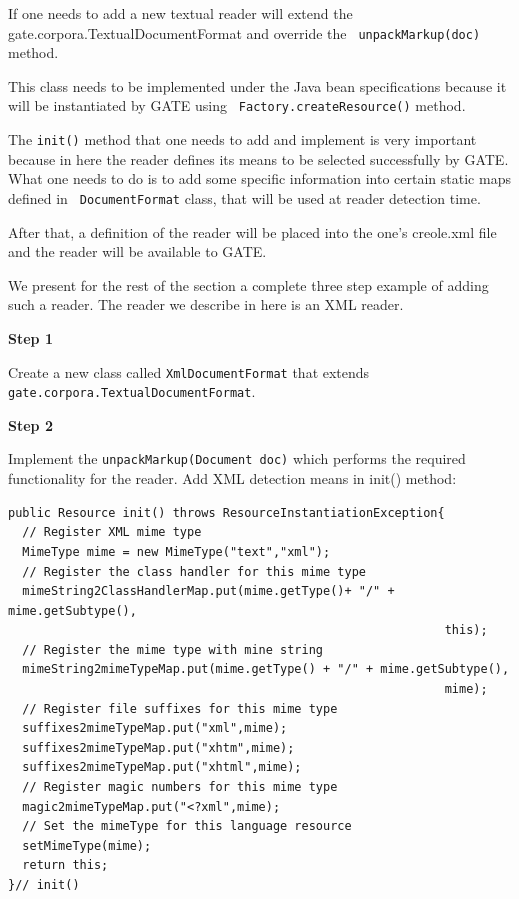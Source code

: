 If one needs to add a new textual reader will extend the
gate.corpora.TextualDocumentFormat and override the {\tt
unpackMarkup(doc)} method.

This class needs to be implemented under the Java bean
specifications because it will be instantiated by GATE using {\tt
Factory.createResource()} method.

The {\tt init()} method that one needs to add and implement is
very important because in here the reader defines its means to be
selected successfully by GATE. What one needs to do is to add some
specific information into certain static maps defined in {\tt
DocumentFormat} class, that will be used at reader detection time.

After that, a definition of the reader will be placed into the
one's creole.xml file and the reader will be available to GATE.

We present for the rest of the section a complete three step
example of adding such a reader. The reader we describe in here is
an XML reader.

{\bf Step 1}

Create a new class called {\tt XmlDocumentFormat} that extends\\
{\tt gate.corpora.TextualDocumentFormat}.

{\bf Step 2}

Implement the {\tt unpackMarkup(Document doc)} which performs the
required functionality for the reader. Add XML detection means in
init() method:

\small
\begin{lstlisting}
public Resource init() throws ResourceInstantiationException{
  // Register XML mime type
  MimeType mime = new MimeType("text","xml");
  // Register the class handler for this mime type
  mimeString2ClassHandlerMap.put(mime.getType()+ "/" + mime.getSubtype(),
                                                             this);
  // Register the mime type with mine string
  mimeString2mimeTypeMap.put(mime.getType() + "/" + mime.getSubtype(),
                                                             mime);
  // Register file suffixes for this mime type
  suffixes2mimeTypeMap.put("xml",mime);
  suffixes2mimeTypeMap.put("xhtm",mime);
  suffixes2mimeTypeMap.put("xhtml",mime);
  // Register magic numbers for this mime type
  magic2mimeTypeMap.put("<?xml",mime);
  // Set the mimeType for this language resource
  setMimeType(mime);
  return this;
}// init()
\end{lstlisting}
\nnormalsize

